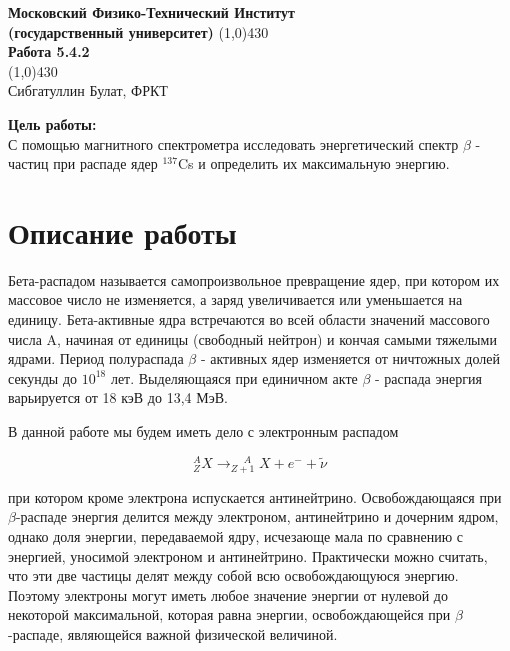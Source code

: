 \documentclass[a4paper, 12pt]{article}%
\begin{document}
\begin{titlepage}

\begin{center}
\large\textbf{Московский Физико-Технический Институт}\\
\large\textbf{(государственный университет)}
\vfill
\line(1,0){430}\\[1mm]
\huge\textbf{Работа 5.4.2}\\
\line(1,0){430}\\[1mm]
\vfill
\large Сибгатуллин Булат, ФРКТ\\
\end{center}

\end{titlepage}
\noindent \textbf{Цель работы:} \\
\indent С помощью магнитного спектрометра исследовать энергетический спектр $\beta$ - частиц при распаде ядер $^{137}$Cs  и определить их максимальную энергию.

\section{Описание работы} 

Бета-распадом называется самопроизвольное превращение ядер, при котором их массовое число не изменяется, а заряд увеличивается или уменьшается на единицу. Бета-активные ядра встречаются во всей области значений массового числа A, начиная от единицы (свободный нейтрон) и кончая самыми тяжелыми ядрами. Период полураспада $\beta$ - активных ядер изменяется от ничтожных долей секунды до $10^{18}$ лет. Выделяющаяся при единичном акте $\beta$ - распада энергия варьируется от 18 кэВ до 13,4 МэВ.

В данной работе мы будем иметь дело с электронным распадом

\begin{equation}\label{}
^A_ZX \rightarrow ^{\; \; \; \; \: A}_{Z+1}X + e^- + \widetilde{\nu}
\end{equation}

при котором кроме электрона испускается антинейтрино. Освобождающаяся при $\beta$-распаде энергия делится между электроном, антинейтрино и дочерним ядром, однако доля энергии, передаваемой ядру, исчезающе мала по сравнению с энергией, уносимой электроном и антинейтрино. Практически можно считать, что эти две частицы делят между собой всю освобождающуюся энергию. Поэтому электроны могут иметь любое значение энергии  от нулевой до некоторой максимальной, которая равна энергии, освобождающейся при $\beta$-распаде, являющейся важной физической величиной.
\end{document}
